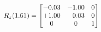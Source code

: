 \documentclass[preview]{standalone}
\begin{document}
\begin{align*}
\special{dvisvgm:raw <g id='unique000'>}R_{z}(1.61) = \begin{bmatrix}-0.03 & -1.00 & 0 \\+1.00 & -0.03 & 0 \\0 & 0 & 1\end{bmatrix}\special{dvisvgm:raw </g>}
\end{align*}
\end{document}
